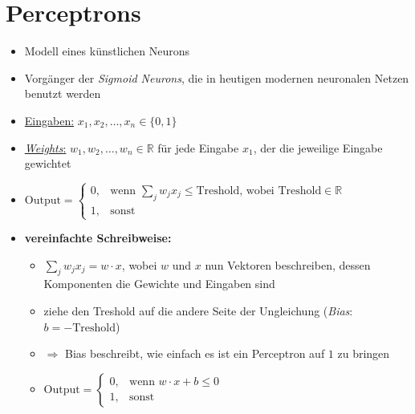 \section{Perceptrons}

\begin{itemize}
  \item Modell eines künstlichen Neurons
  \item Vorgänger der \emph{Sigmoid Neurons}, die in heutigen modernen neuronalen Netzen benutzt werden
\end{itemize}

\begin{center}
\end{center}

\begin{itemize}
  \item \underline{Eingaben:} $x_1, x_2, \ldots, x_n \in \lbrace 0, 1 \rbrace$
  \item \underline{\emph{Weights}:} $w_1, w_2, \ldots, w_n \in \mathbb{R}$ für jede Eingabe $x_1$, der die jeweilige Eingabe gewichtet
  \item $\text{Output} = \begin{cases}
      0, & \text{wenn }\sum_j w_j x_j \leq \text{Treshold, wobei Treshold} \in \mathbb{R}\\
    1, & \text{sonst}
  \end{cases}$
  \item \textbf{vereinfachte Schreibweise:}
  \begin{itemize}
    \item $\sum_j w_j x_j = w \cdot x$, wobei $w$ und $x$ nun Vektoren beschreiben, dessen Komponenten die Gewichte und Eingaben sind
    \item ziehe den Treshold auf die andere Seite der Ungleichung (\emph{Bias}: $b = - \text{Treshold}$)
    \item $\Rightarrow$ Bias beschreibt, wie einfach es ist ein Perceptron auf $1$ zu bringen
    \item $\text{Output} = \begin{cases}
      0, & \text{wenn }w \cdot x + b \leq 0\\
      1, & \text{sonst}
    \end{cases}$
  \end{itemize}
\end{itemize}


